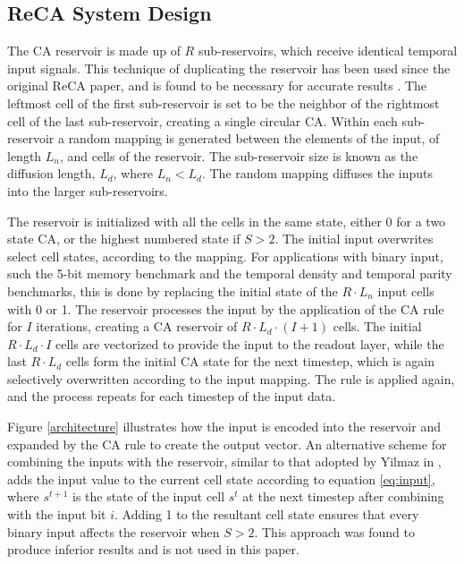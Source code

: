 \documentclass{elsarticle}
\begin{document}
\begin{multicols}{2}
	\subsection{ReCA System Design}
	The CA reservoir is made up of $R$ sub-reservoirs, which receive identical 
	temporal input signals. This technique of duplicating the reservoir has been 
	used since the original ReCA paper, and is found to be necessary for accurate 
	results \cite{yilmaz2014reservoir}.
	The leftmost cell of the first sub-reservoir is set to be the 
	neighbor of the rightmost cell of the last sub-reservoir, creating a single 
	circular CA.  Within each sub-reservoir a random mapping is generated between 
	the elements of the input, of length $L_{n}$, and cells of the reservoir. The 
	sub-reservoir size is known as the diffusion length, $L_{d}$, where $L_{n} < 
	L_{d}$. The random mapping diffuses the inputs into the larger sub-reservoirs.  
	\par The reservoir is initialized with all the cells in the same state, either 
	0 for a two state CA, or the highest numbered state if $S > 2$. The initial 
	input overwrites select cell states, according to the mapping. For applications 
	with binary input, such the 5-bit memory benchmark and the temporal density and 
	temporal parity benchmarks, this is done by replacing the initial state of the 
	$R \cdot L_{n}$ input cells with 0 or 1.  The reservoir processes the input by 
	the application of the CA rule for $I$ iterations, creating a CA reservoir of $R 
	\cdot L_{d} \cdot (I + 1)$ cells.  The initial $R \cdot L_{d} \cdot I$ cells 
	are vectorized to provide the input to the readout layer, while the last $R 
	\cdot L_{d}$ cells form the initial CA state for the next timestep, which is 
	again selectively overwritten according to the input mapping. The rule is 
	applied again, and the process repeats for each timestep of the input data.  
	\par  
	
	
	Figure \ref{architecture} illustrates how the input is encoded into the 
	reservoir and expanded by the CA rule to create the output vector.  An 
	alternative scheme for combining the inputs with the reservoir, similar to that 
	adopted by Yilmaz in \cite{yilmaz2015connectionist}, adds the input value to 
	the current cell state according to equation \ref{eq:input}, where $s^{t+1}$ is 
	the state of the input cell $s^t$ at the next timestep after combining with the 
	input bit $i$.  Adding 1 to the resultant cell state ensures that every binary 
	input affects the reservoir when $S > 2$.  This approach was found to produce 
	inferior results and is not used in this paper.
	

\end{multicols}
\end{document}
